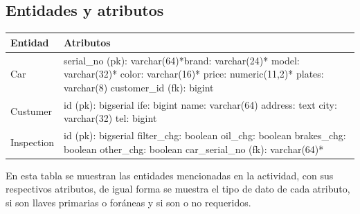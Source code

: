 \documentclass[spanish,12pt,letterpapper]{article}
\begin{document}
	\subsection{Entidades y atributos}
	\begin{center}
	\begin{tabular}{| p{4cm} | p{4cm} |}
	\hline
	
	\textbf{Entidad} & \textbf{Atributos}\\
	\hline
	Car & serial\_no (pk): varchar(64)*\linebreak brand: varchar(24)* \linebreak model: varchar(32)* \linebreak color: varchar(16)* \linebreak price: numeric(11,2)* \linebreak plates: varchar(8) \linebreak customer\_id (fk): bigint\\
	\hline
	Custumer & id (pk): bigserial \linebreak ife: bigint  \linebreak name: varchar(64) \linebreak address: text \linebreak city: varchar(32) \linebreak tel: bigint \\
	\hline
	Inspection & id (pk): bigserial \linebreak filter\_chg: boolean \linebreak oil\_chg: boolean  \linebreak brakes\_chg: boolean \linebreak other\_chg: boolean \linebreak car\_serial\_no (fk): varchar(64)* \\
	
	\hline	
	\end{tabular}
	\end{center}
	
	En esta tabla se muestran las entidades mencionadas en la actividad, con sus respectivos atributos, de igual forma se muestra el tipo de dato de cada atributo, si son llaves primarias o foráneas y si son o no requeridos.
	
\end{document}
